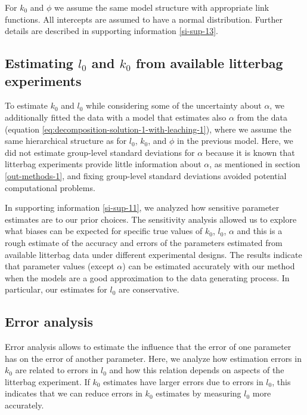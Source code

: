 \documentclass[bg, manuscript]{copernicus}
\begin{document}
For \(k_0\) and \(\phi\) we assume the same model structure with appropriate link functions. All intercepts are assumed to have a normal distribution. Further details are described in supporting information \ref{si-sup-13}.

\hypertarget{methods-estimate-real-1}{%
\subsection{\texorpdfstring{Estimating \(l_0\) and \(k_0\) from available litterbag experiments}{Estimating l\_0 and k\_0 from available litterbag experiments}}\label{methods-estimate-real-1}}

To estimate \(k_0\) and \(l_0\) while considering some of the uncertainty about \(\alpha\), we additionally fitted the data with a model that estimates also \(\alpha\) from the data (equation \eqref{eq:decomposition-solution-1-with-leaching-1}), where we assume the same hierarchical structure as for \(l_0\), \(k_0\), and \(\phi\) in the previous model. Here, we did not estimate group-level standard deviations for \(\alpha\) because it is known that litterbag experiments provide little information about \(\alpha\), as mentioned in section \ref{out-methods-1}, and fixing group-level standard deviations avoided potential computational problems.

In supporting information \ref{si-sup-11}, we analyzed how sensitive parameter estimates are to our prior choices. The sensitivity analysis allowed us to explore what biases can be expected for specific true values of \(k_0\), \(l_0\), \(\alpha\) and this is a rough estimate of the accuracy and errors of the parameters estimated from available litterbag data under different experimental designs. The results indicate that parameter values (except \(\alpha\)) can be estimated accurately with our method when the models are a good approximation to the data generating process. In particular, our estimates for \(l_0\) are conservative.

\subsection{Error analysis}

Error analysis allows to estimate the influence that the error of one parameter has on the error of another parameter. Here, we analyze how estimation errors in \(k_0\) are related to errors in \(l_0\) and how this relation depends on aspects of the litterbag experiment. If \(k_0\) estimates have larger errors due to errors in \(l_0\), this indicates that we can reduce errors in \(k_0\) estimates by measuring \(l_0\) more accurately.
\end{document}
